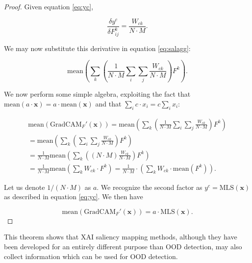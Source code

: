 \documentclass[runningheads]{llncs}
\begin{document}
\begin{proof}
\noindent Given equation \ref{eq:yc},

\begin{equation}
    \frac{\delta y^c}{\delta F^k_{ij}} = \frac{W_{ck}}{N \cdot M}.
\end{equation}

\noindent We may now substitute this derivative in equation \ref{eq:salagg}:

\begin{equation}
    \text{mean} \left(\sum_k \left( \frac{1}{N \cdot M} \sum_i \sum_j \frac{W_{ck}}{N \cdot M} \right) F^k \right).
\end{equation}

\noindent We now perform some simple algebra, exploiting the fact that $\text{mean}(a \cdot \bm{x}) = a \cdot \text{mean}(\bm{x})$ and that $\sum_i c \cdot x_i = c \sum_i x_i$:

\begin{gather}
    \text{mean}(\text{GradCAM}_F'(\bm{x})) =
    \text{mean} \left(\sum_k \left( \frac{1}{N \cdot M} \sum_i \sum_j \frac{W_{ck}}{N \cdot M} \right) F^k \right) \\
    = \text{mean} \left(\sum_k \left(  \sum_i \sum_j \frac{W_{ck}}{N \cdot M}  \right) F^k \right) \\
    = \frac{1}{N \cdot M} \text{mean} \left(\sum_k \left( (N \cdot M) \frac{W_{ck}}{N \cdot M} \right) F^k \right) \\
    = \frac{1}{N \cdot M} \text{mean} \left(\sum_k  W_{ck} \cdot F^k \right) =
    \frac{1}{N \cdot M} \cdot \left( \sum_k  W_{ck} \cdot \text{mean}(F^k) \right).
\end{gather}

\noindent Let us denote $1/(N \cdot M)$ as $a$. We recognize the second factor as $y^c = \text{MLS}(\bm{x})$ as described in equation \ref{eq:yc}. We then have

\begin{equation}
    \text{mean}(\text{GradCAM}_F'(\bm{x})) = a \cdot \text{MLS}(\bm{x}).
\end{equation}

\end{proof}

This theorem shows that XAI saliency mapping methods, although they have been developed for an entirely different purpose than OOD detection, may also collect information which can be used for OOD detection.
\end{document}
